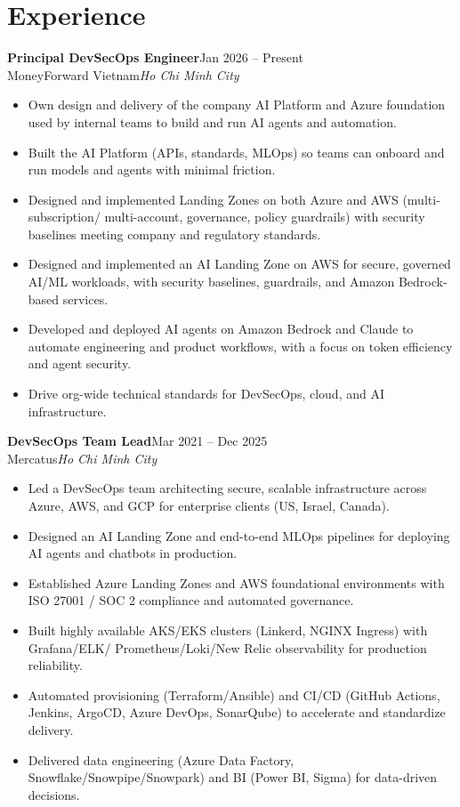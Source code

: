 \documentclass[a4paper,10pt]{article}
\newcommand{\role}[4]{%
  \textbf{#1}\hfill{\color{muted}\small #3}\\[1pt]
  {\color{accent}#2}\hfill{\color{muted}\small\textit{#4}}\par\vspace{3pt}}
\begin{document}
\section{Experience}

\role{Principal DevSecOps Engineer}{MoneyForward Vietnam}{Jan 2026 -- Present}{Ho Chi Minh City}
\begin{itemize}
  \item Own design and delivery of the company AI Platform and Azure foundation used by
        internal teams to build and run AI agents and automation.
  \item Built the AI Platform (APIs, standards, MLOps) so teams can onboard and run models and
        agents with minimal friction.
  \item Designed and implemented Landing Zones on both Azure and AWS (multi-subscription/
        multi-account, governance, policy guardrails) with security baselines meeting company
        and regulatory standards.
  \item Designed and implemented an AI Landing Zone on AWS for secure, governed AI/ML workloads,
        with security baselines, guardrails, and Amazon Bedrock-based services.
  \item Developed and deployed AI agents on Amazon Bedrock and Claude to automate engineering and
        product workflows, with a focus on token efficiency and agent security.
  \item Drive org-wide technical standards for DevSecOps, cloud, and AI infrastructure.
\end{itemize}

\role{DevSecOps Team Lead}{Mercatus}{Mar 2021 -- Dec 2025}{Ho Chi Minh City}
\begin{itemize}
  \item Led a DevSecOps team architecting secure, scalable infrastructure across Azure, AWS,
        and GCP for enterprise clients (US, Israel, Canada).
  \item Designed an AI Landing Zone and end-to-end MLOps pipelines for deploying AI agents and
        chatbots in production.
  \item Established Azure Landing Zones and AWS foundational environments with ISO 27001 / SOC 2
        compliance and automated governance.
  \item Built highly available AKS/EKS clusters (Linkerd, NGINX Ingress) with Grafana/ELK/
        Prometheus/Loki/New Relic observability for production reliability.
  \item Automated provisioning (Terraform/Ansible) and CI/CD (GitHub Actions, Jenkins, ArgoCD,
        Azure DevOps, SonarQube) to accelerate and standardize delivery.
  \item Delivered data engineering (Azure Data Factory, Snowflake/Snowpipe/Snowpark) and BI
        (Power BI, Sigma) for data-driven decisions.
\end{itemize}
\end{document}
